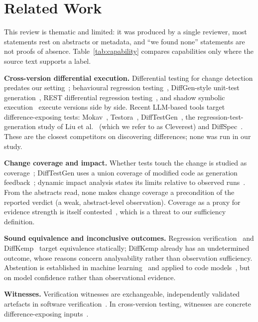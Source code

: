 \section{Related Work}\label{sec:related}
This review is thematic and limited: it was produced by a single reviewer, most statements rest on abstracts or metadata, and ``we found none'' statements are not proofs of absence. Table~\ref{tab:capability} compares capabilities only where the source text supports a label.

\textbf{Cross-version differential execution.} Differential testing for change detection predates our setting~\cite{evans2007}; behavioural regression testing~\cite{jin2010automated}, DiffGen-style unit-test generation~\cite{taneja2008diffgen}, REST differential regression testing~\cite{godefroid2020differential}, and shadow symbolic execution~\cite{palikareva2016} execute versions side by side. Recent LLM-based tools target difference-exposing tests: Mokav~\cite{etemadi2024mokav}, Testora~\cite{pradel2025testora}, DiffTestGen~\cite{hu2026difftestgen}, the regression-test-generation study of Liu et al.~\cite{liu2025evaluating} (which we refer to as Cleverest) and DiffSpec~\cite{rao2024diffspec}. These are the closest competitors on discovering differences; none was run in our study.

\textbf{Change coverage and impact.} Whether tests touch the change is studied as coverage~\cite{hilton2018a}; DiffTestGen uses a union coverage of modified code as generation feedback~\cite{hu2026difftestgen}; dynamic impact analysis states its limits relative to observed runs~\cite{law2003,orso2003}. From the abstracts read, none makes change coverage a precondition of the reported verdict (a weak, abstract-level observation). Coverage as a proxy for evidence strength is itself contested~\cite{inozemtseva2014coverage,just2014mut}, which is a threat to our sufficiency definition.

\textbf{Sound equivalence and inconclusive outcomes.} Regression verification~\cite{godlin2009,felsing2014} and DiffKemp~\cite{malik2021} target equivalence statically; DiffKemp already has an undetermined outcome, whose reasons concern analysability rather than observation sufficiency. Abstention is established in machine learning~\cite{chow1970on,geifman2017,hendrickx2024machine} and applied to code models~\cite{spiess2025calibration}, but on model confidence rather than observational evidence.

\textbf{Witnesses.} Verification witnesses are exchangeable, independently validated artefacts in software verification~\cite{beyer2022verification,beyer2015witness,beyer2016correctness}. In cross-version testing, witnesses are concrete difference-exposing inputs~\cite{palikareva2016,etemadi2024mokav}.

